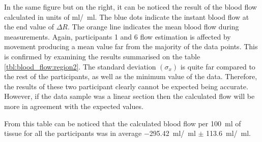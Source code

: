 In the same figure but on the right, it can be noticed the result of the blood flow calculated in units of \si{\ml /  \ml}. The blue dots indicate the instant blood flow at the end value of $\Delta R$. The orange line indicates the mean blood flow during measurements. Again, participants 1 and 6 flow estimation is affected by movement producing a mean value far from the majority of the data points. This is confirmed by examining the results summarised on the table \ref{tbl:blood_flow:region2}. The standard deviation $(\sigma_x)$ is quite far compared to the rest of the participants, as well as the minimum value of the data. Therefore, the results of these two participant clearly cannot be expected being accurate. However, if the data sample was a linear section then the calculated flow will be more in agreement with the expected values. 

From this table can be noticed that the calculated blood flow per \SI{100}{\ml} of tissue for all the participants was in average \SI{-295.42}{\ml / \ml} $\pm$ \SI{113.6}{\ml/\ml}. 






